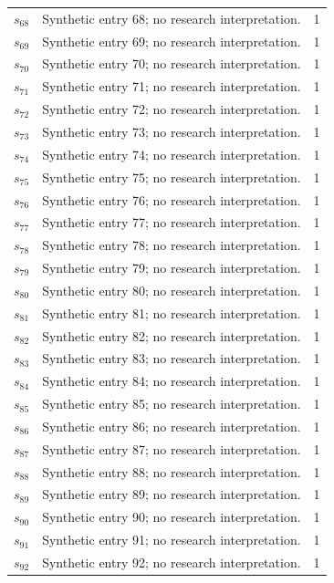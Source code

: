 \documentclass[11pt,a4paper]{article}
\begin{document}
\begin{longtable}{p{.15\linewidth}p{.55\linewidth}p{.15\linewidth}}
$s_{68}$ & Synthetic entry 68; no research interpretation. & 1 \\
$s_{69}$ & Synthetic entry 69; no research interpretation. & 1 \\
$s_{70}$ & Synthetic entry 70; no research interpretation. & 1 \\
$s_{71}$ & Synthetic entry 71; no research interpretation. & 1 \\
$s_{72}$ & Synthetic entry 72; no research interpretation. & 1 \\
$s_{73}$ & Synthetic entry 73; no research interpretation. & 1 \\
$s_{74}$ & Synthetic entry 74; no research interpretation. & 1 \\
$s_{75}$ & Synthetic entry 75; no research interpretation. & 1 \\
$s_{76}$ & Synthetic entry 76; no research interpretation. & 1 \\
$s_{77}$ & Synthetic entry 77; no research interpretation. & 1 \\
$s_{78}$ & Synthetic entry 78; no research interpretation. & 1 \\
$s_{79}$ & Synthetic entry 79; no research interpretation. & 1 \\
$s_{80}$ & Synthetic entry 80; no research interpretation. & 1 \\
$s_{81}$ & Synthetic entry 81; no research interpretation. & 1 \\
$s_{82}$ & Synthetic entry 82; no research interpretation. & 1 \\
$s_{83}$ & Synthetic entry 83; no research interpretation. & 1 \\
$s_{84}$ & Synthetic entry 84; no research interpretation. & 1 \\
$s_{85}$ & Synthetic entry 85; no research interpretation. & 1 \\
$s_{86}$ & Synthetic entry 86; no research interpretation. & 1 \\
$s_{87}$ & Synthetic entry 87; no research interpretation. & 1 \\
$s_{88}$ & Synthetic entry 88; no research interpretation. & 1 \\
$s_{89}$ & Synthetic entry 89; no research interpretation. & 1 \\
$s_{90}$ & Synthetic entry 90; no research interpretation. & 1 \\
$s_{91}$ & Synthetic entry 91; no research interpretation. & 1 \\
$s_{92}$ & Synthetic entry 92; no research interpretation. & 1 \\

\end{longtable}
\end{document}

